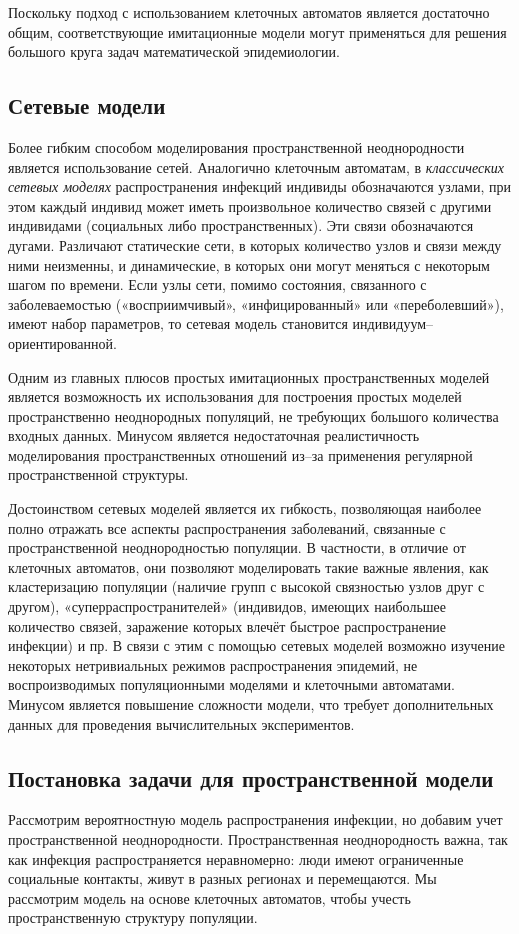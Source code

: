 \documentclass[a4paper, 14pt]{extreport}
\begin{document}
	Поскольку подход с использованием клеточных автоматов является
	достаточно общим, соответствующие имитационные модели могут
	применяться для решения большого круга задач математической
	эпидемиологии. 
	
	\subsection{Сетевые модели}
	
	Более гибким способом моделирования пространственной неоднородности
	является использование сетей. Аналогично клеточным автоматам, в
	\textit{классических сетевых моделях} распространения инфекций индивиды
	обозначаются узлами, при этом каждый индивид может иметь произвольное
	количество связей с другими индивидами (социальных либо пространственных).
	Эти связи обозначаются дугами. Различают статические сети, в которых
	количество узлов и связи между ними неизменны, и динамические, в которых
	они могут меняться с некоторым шагом по времени. Если узлы сети, помимо
	состояния, связанного с заболеваемостью («восприимчивый»,
	«инфицированный» или «переболевший»), имеют набор параметров, то сетевая
	модель становится индивидуум–ориентированной.
	
	Одним из главных плюсов простых
	имитационных пространственных моделей является возможность их
	использования для построения простых моделей пространственно
	неоднородных популяций, не требующих большого количества входных
	данных. Минусом является недостаточная реалистичность моделирования
	пространственных отношений из–за применения регулярной пространственной
	структуры.
	
	Достоинством сетевых моделей является их гибкость, позволяющая
	наиболее полно отражать все аспекты распространения заболеваний, связанные
	с пространственной неоднородностью популяции. В частности, в отличие от
	клеточных автоматов, они позволяют моделировать такие важные явления, как
	кластеризацию популяции (наличие групп с высокой связностью узлов друг с
	другом), «суперраспространителей» (индивидов, имеющих наибольшее
	количество связей, заражение которых влечёт быстрое распространение
	инфекции) и пр. В связи с этим с помощью сетевых моделей возможно
	изучение некоторых нетривиальных режимов распространения эпидемий, не
	воспроизводимых популяционными моделями и клеточными автоматами.
	Минусом является повышение сложности модели, что требует дополнительных
	данных для проведения вычислительных экспериментов.
	\subsection{Постановка задачи для пространственной модели}
	Рассмотрим вероятностную модель распространения инфекции, но добавим учет пространственной неоднородности. Пространственная неоднородность важна, так как инфекция распространяется неравномерно: люди имеют ограниченные социальные контакты, живут в разных регионах и перемещаются. Мы рассмотрим модель на основе клеточных автоматов, чтобы учесть пространственную структуру популяции.
	
\end{document}
